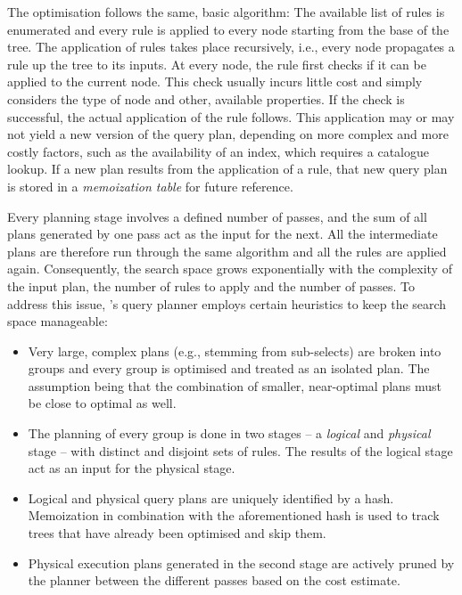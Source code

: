 The optimisation follows the same, basic algorithm: The available list of rules is enumerated and every rule is applied to every node starting from the base of the tree. The application of rules takes place recursively, i.e., every node propagates a rule up the tree to its inputs. At every node, the rule first checks if it can be applied to the current node. This check usually incurs little cost and simply considers the type of node and other, available properties. If the check is successful, the actual application of the rule follows. This application may or may not yield a new version of the query plan, depending on more complex and more costly factors, such as the availability of an index, which requires a catalogue lookup. If a new plan results from the application of a rule, that new query plan is stored in a \emph{memoization table} for future reference. 

Every planning stage involves a defined number of passes, and the sum of all plans generated by one pass act as the input for the next. All the intermediate plans are therefore run through the same algorithm and all the rules are applied again. Consequently, the search space grows exponentially with the complexity of the input plan, the number of rules to apply and the number of passes. To address this issue, \cottontail{}'s query planner employs certain heuristics to keep the search space manageable:

\begin{itemize}
    \item Very large, complex plans (e.g., stemming from sub-selects) are broken into groups and every group is optimised and treated as an isolated plan. The assumption being that the combination of smaller, near-optimal plans must be close to optimal as well.
    \item The planning of every group is done in two stages -- a \emph{logical} and \emph{physical} stage -- with distinct and disjoint sets of rules. The results of the logical stage act as an input for the physical stage.
    \item Logical and physical query plans are uniquely identified by a hash. Memoization in combination with the aforementioned hash is used to track trees that have already been optimised and skip them.
    \item Physical execution plans generated in the second stage are actively pruned by the planner between the different passes based on the cost estimate.
\end{itemize}

